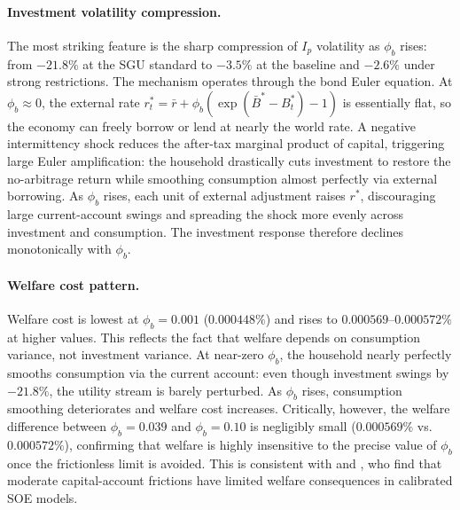 \documentclass[12pt, a4paper]{article}
\begin{document}
	\paragraph{Investment volatility compression.} The most striking feature is the sharp compression of $I_p$ volatility as $\phi_b$ rises: from $-21.8\%$ at the SGU standard to $-3.5\%$ at the baseline and $-2.6\%$ under strong restrictions. The mechanism operates through the bond Euler equation. At $\phi_b \approx 0$, the external rate $r^*_t = \bar{r} + \phi_b(\exp(\bar{B}^*-B^*_t)-1)$ is essentially flat, so the economy can freely borrow or lend at nearly the world rate. A negative intermittency shock reduces the after-tax marginal product of capital, triggering large Euler amplification: the household drastically cuts investment to restore the no-arbitrage return while smoothing consumption almost perfectly via external borrowing. As $\phi_b$ rises, each unit of external adjustment raises $r^*$, discouraging large current-account swings and spreading the shock more evenly across investment and consumption. The investment response therefore declines monotonically with $\phi_b$.

	\paragraph{Welfare cost pattern.} Welfare cost is lowest at $\phi_b = 0.001$ ($0.000448\%$) and rises to $0.000569$--$0.000572\%$ at higher values. This reflects the fact that welfare depends on consumption variance, not investment variance. At near-zero $\phi_b$, the household nearly perfectly smooths consumption via the current account: even though investment swings by $-21.8\%$, the utility stream is barely perturbed. As $\phi_b$ rises, consumption smoothing deteriorates and welfare cost increases. Critically, however, the welfare difference between $\phi_b = 0.039$ and $\phi_b = 0.10$ is negligibly small ($0.000569\%$ vs.\ $0.000572\%$), confirming that welfare is highly insensitive to the precise value of $\phi_b$ once the frictionless limit is avoided. This is consistent with \citet{mendoza1991} and \citet{neumeyer2005}, who find that moderate capital-account frictions have limited welfare consequences in calibrated SOE models.
\end{document}
